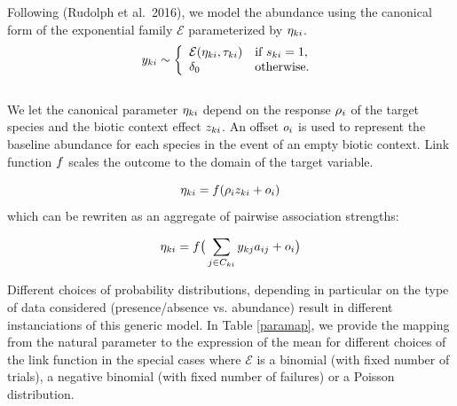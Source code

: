 \documentclass[10pt,a4paper]{article}
\begin{document}
Following (Rudolph et al.\ 2016), we model the abundance using the canonical form of the exponential family $\mathcal{E}$ parameterized by $\eta_{ki}$.
\begin{equation*}
y_{ki} \sim \left\{
\begin{array}{ll}
\mathcal{E}(\eta_{ki},\tau_{ki}) & \mbox{if } s_{ki}=1, \\
\delta_0 & \mbox{otherwise.}\\
\end{array}
\right. \\
\end{equation*} \\

We let the canonical parameter $\eta_{ki}$ depend on the response $\rho_i$ of the target species and the biotic context effect $z_{ki}$. An offset $o_{i}$ is used to represent the baseline abundance for each species in the event of an empty biotic context. Link function $f$ scales the outcome to the domain of the target variable. 

\begin{equation*}
  \eta_{ki} = f(\rho_i z_{ki} + o_i)
\end{equation*}
which can be rewriten as an aggregate of pairwise association strengths:

\begin{equation*}
  \eta_{ki} = f\big( \sum_{j \in C_{ki}} y_{kj}  a_{ij} + o_i\big) \\
\end{equation*} 


Different choices of probability distributions, depending in particular on the type of data considered (presence/absence vs. abundance) result in different instanciations of this generic model.
In Table \ref{paramap}, we provide the mapping from the natural parameter to the expression of the mean for different choices of the link function in the special cases where $\mathcal{E}$ is a binomial (with fixed number of trials), a negative binomial (with fixed number of failures) or a Poisson distribution. 
\end{document}
